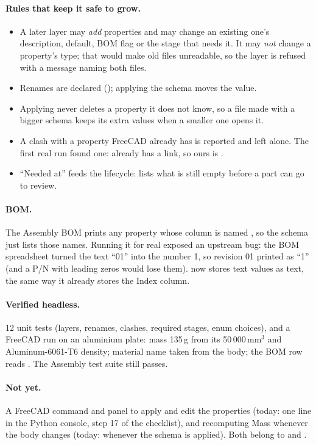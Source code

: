 \paragraph{Rules that keep it safe to grow.}
\begin{itemize}[nosep]
  \item A later layer may \emph{add} properties and may change an existing one's description, default, BOM flag
        or the stage that needs it. It may \emph{not} change a property's type; that would make old files
        unreadable, so the layer is refused with a message naming both files.
  \item Renames are declared (); applying the schema moves the value.
  \item Applying never deletes a property it does not know, so a file made with a bigger schema keeps its extra
        values when a smaller one opens it.
  \item A clash with a property FreeCAD already has is reported and left alone. The first real run found one:
         already has a  link, so ours is .
  \item ``Needed at'' feeds the lifecycle:  lists what is still empty before a part can go to review.
\end{itemize}

\paragraph{BOM.} The Assembly BOM prints any property whose column is named , so the schema
just lists those names. Running it for real exposed an upstream bug: the BOM spreadsheet turned the text
``01'' into the number 1, so revision 01 printed as ``1'' (and a P/N with leading zeros would lose them).
 now stores text values as text, the same way it already stores the Index column.

\paragraph{Verified headless.} 12 unit tests (layers, renames, clashes, required stages, enum choices), and a
FreeCAD run on an aluminium plate: mass 135\,g from its 50\,000\,mm$^3$ and Aluminum-6061-T6 density; material
name taken from the body; the BOM row reads . The Assembly test suite still passes.

\paragraph{Not yet.} A FreeCAD command and panel to apply and edit the properties (today: one line in the Python
console, step 17 of the checklist), and recomputing Mass whenever the body changes (today: whenever the schema is
applied). Both belong to  and .
